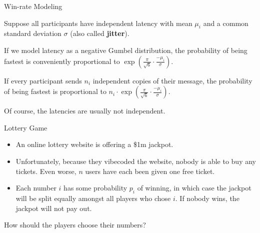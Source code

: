 \documentclass{beamer}
\begin{document}
\begin{frame}{Win-rate Modeling}

	Suppose all participants have independent latency with mean $\mu_i$ and a common standard deviation $\sigma$ (also called \textbf{jitter}).

	If we model latency as a negative Gumbel distribution, the probability of being fastest is conveniently proportional to $\exp\left(\frac{\pi}{\sqrt{6}} \cdot \frac{-\mu_i}{\sigma}\right)$.

	If every participant sends $n_i$ independent copies of their message, the probability of being fastest is proportional to $n_i \cdot \exp\left(\frac{\pi}{\sqrt{6}} \cdot \frac{-\mu_i}{\sigma}\right)$.

	Of course, the latencies are usually not independent.
	\begin{center}
	\end{center}
\end{frame}

\begin{frame}{Lottery Game}
	\begin{block}{}
		\begin{itemize}
			\item An online lottery website is offering a \$1m jackpot.
			\item Unfortunately, because they vibecoded the website, nobody is able to buy any tickets. Even worse, $n$ users have each been given one free ticket.
			\item Each number $i$ has some probability $p_i$ of winning, in which case the jackpot will be split equally amongst all players who chose $i$. If nobody wins, the jackpot will not pay out.
		\end{itemize}

		How should the players choose their numbers?
	\end{block}

\end{frame}
\end{document}
